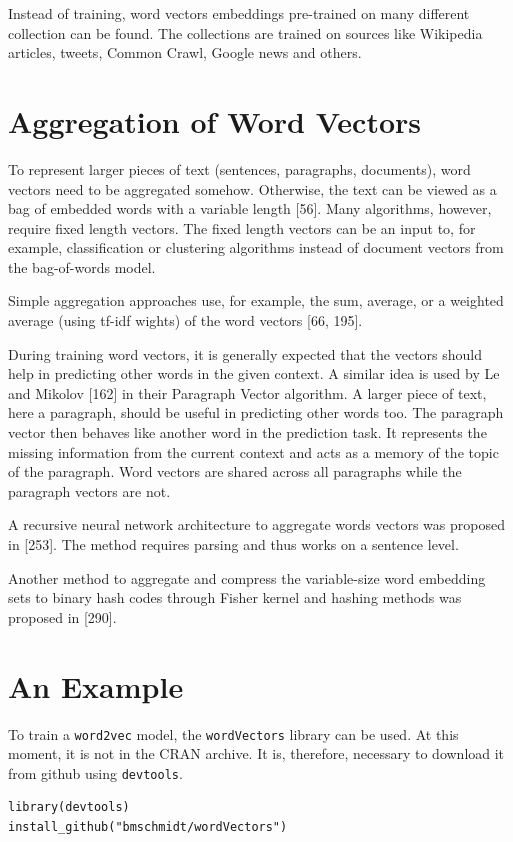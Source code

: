 \documentclass[11pt,openany,executivepaper]{book}
\begin{document}
Instead of training, word vectors embeddings pre-trained on many different collection can be found. The collections are trained on sources like Wikipedia articles, tweets, Common Crawl, Google news and others.

\section{Aggregation of Word Vectors}
To represent larger pieces of text (sentences, paragraphs, documents), word vectors need to be aggregated somehow. Otherwise, the text can be viewed as a bag of embedded words with a variable length [56]. Many algorithms, however, require fixed length vectors. The fixed length vectors can be an input to, for example, classification or clustering algorithms instead of document vectors from the bag-of-words model.

Simple aggregation approaches use, for example, the sum, average, or a weighted average (using tf-idf wights) of the word vectors [66, 195].

During training word vectors, it is generally expected that the vectors should help in predicting other words in the given context. A similar idea is used by Le and Mikolov [162] in their Paragraph Vector algorithm. A larger piece of text, here a paragraph, should be useful in predicting other words too. The paragraph vector then behaves like another word in the prediction task. It represents the missing information from the current context and acts as a memory of the topic of the paragraph. Word vectors are shared across all paragraphs while the paragraph vectors are not.

A recursive neural network architecture to aggregate words vectors was proposed in [253]. The method requires parsing and thus works on a sentence level.

Another method to aggregate and compress the variable-size word embedding sets to binary hash codes through Fisher kernel and hashing methods was proposed in [290].

\section{An Example}
To train a \texttt{word2vec} model, the \texttt{wordVectors} library can be used. At this moment, it is not in the CRAN archive. It is, therefore, necessary to download it from github using \texttt{devtools}.

\begin{verbatim}
library(devtools)
install_github("bmschmidt/wordVectors")
\end{verbatim}
\end{document}
